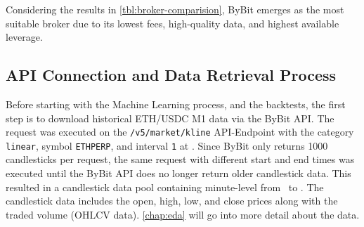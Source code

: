 Considering the results in \autoref{tbl:broker-comparision}, ByBit emerges as the most suitable broker due to its lowest fees, high-quality data, and highest available leverage.


\subsection{API Connection and Data Retrieval Process}
\label{chap:api-connection}

Before starting with the Machine Learning process, and the backtests, the first step is to download historical ETH/USDC M1 data via the ByBit API.
The request was executed on the \texttt{/v5/market/kline} API-Endpoint \cite{bybit-api-doc-get-kline} with the category \texttt{linear}, symbol \texttt{ETHPERP}, and interval \texttt{1} at \ethDataEndDate.
Since ByBit only returns 1000 candlesticks per request, the same request with different start and end times was executed until the ByBit API does no longer return older candlestick data.
This resulted in a candlestick data pool containing minute-level from \ethDataStartDate~to \ethDataEndDate.
The candlestick data includes the open, high, low, and close prices along with the traded volume (OHLCV data).
\autoref{chap:eda} will go into more detail about the data.